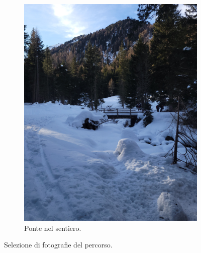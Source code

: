 \documentclass{article}
\begin{document}
\begin{figure}[H]
\begin{subfigure}[b]{0.45\textwidth}
        \includegraphics[width=\textwidth]{images/foto_ponte.jpg}
        \caption{Ponte nel sentiero.}
    \end{subfigure}
    \hfill

    \caption{Selezione di fotografie del percorso.}
\end{figure}
\end{document}
